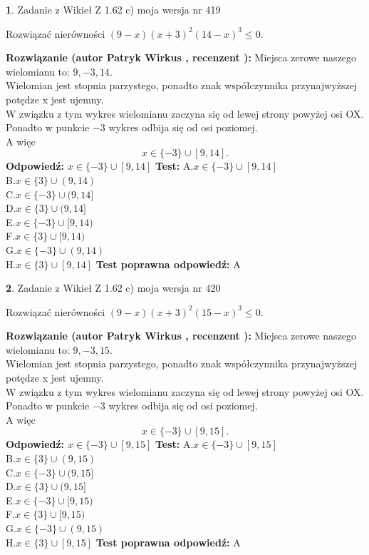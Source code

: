 \documentclass[12pt, a4paper]{article}
\theoremstyle{definition} %
\newtheorem{zad}{}
\newcommand{\zadStart}[1]{\begin{zad}#1\newline}
\newcommand{\zadStop}{\end{zad}}
\newcommand{\rozwStart}[2]{\noindent \textbf{Rozwiązanie (autor #1 , recenzent #2): }\newline}
\newcommand{\rozwStop}{\newline}
\newcommand{\odpStart}{\noindent \textbf{Odpowiedź:}\newline}
\newcommand{\odpStop}{\newline}
\newcommand{\testStart}{\noindent \textbf{Test:}\newline}
\newcommand{\testStop}{\newline}
\newcommand{\kluczStart}{\noindent \textbf{Test poprawna odpowiedź:}\newline}
\newcommand{\kluczStop}{\newline}
\begin{document}
\zadStart{Zadanie z Wikieł Z 1.62 c) moja wersja nr 419}

Rozwiązać nierówności $(9-x)(x+3)^{2}(14-x)^{3}\le0$.
\zadStop
\rozwStart{Patryk Wirkus}{}
Miejsca zerowe naszego wielomianu to: $9, -3, 14$.\\
Wielomian jest stopnia parzystego, ponadto znak współczynnika przy\linebreak najwyższej potędze x jest ujemny.\\ W związku z tym wykres wielomianu zaczyna się od lewej strony powyżej osi OX.\\
Ponadto w punkcie $-3$ wykres odbija się od osi poziomej.\\
A więc $$x \in \{-3\} \cup [9,14].$$
\rozwStop
\odpStart
$x \in \{-3\} \cup [9,14]$
\odpStop
\testStart
A.$x \in \{-3\} \cup [9,14]$\\
B.$x \in \{3\} \cup (9,14)$\\
C.$x \in \{-3\} \cup (9,14]$\\
D.$x \in \{3\} \cup (9,14]$\\
E.$x \in \{-3\} \cup [9,14)$\\
F.$x \in \{3\} \cup [9,14)$\\
G.$x \in \{-3\} \cup (9,14)$\\
H.$x \in \{3\} \cup [9,14]$
\testStop
\kluczStart
A
\kluczStop



\zadStart{Zadanie z Wikieł Z 1.62 c) moja wersja nr 420}

Rozwiązać nierówności $(9-x)(x+3)^{2}(15-x)^{3}\le0$.
\zadStop
\rozwStart{Patryk Wirkus}{}
Miejsca zerowe naszego wielomianu to: $9, -3, 15$.\\
Wielomian jest stopnia parzystego, ponadto znak współczynnika przy\linebreak najwyższej potędze x jest ujemny.\\ W związku z tym wykres wielomianu zaczyna się od lewej strony powyżej osi OX.\\
Ponadto w punkcie $-3$ wykres odbija się od osi poziomej.\\
A więc $$x \in \{-3\} \cup [9,15].$$
\rozwStop
\odpStart
$x \in \{-3\} \cup [9,15]$
\odpStop
\testStart
A.$x \in \{-3\} \cup [9,15]$\\
B.$x \in \{3\} \cup (9,15)$\\
C.$x \in \{-3\} \cup (9,15]$\\
D.$x \in \{3\} \cup (9,15]$\\
E.$x \in \{-3\} \cup [9,15)$\\
F.$x \in \{3\} \cup [9,15)$\\
G.$x \in \{-3\} \cup (9,15)$\\
H.$x \in \{3\} \cup [9,15]$
\testStop
\kluczStart
A
\kluczStop
\end{document}

